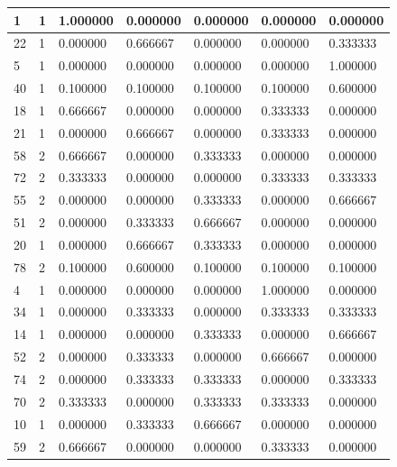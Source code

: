 {\begin{tabular}{|l|l|l|l|l|l|l|}
        1 & 1 & 1.000000 & 0.000000 & 0.000000 & 0.000000 & 0.000000 \\ \hline
        22 & 1 & 0.000000 & 0.666667 & 0.000000 & 0.000000 & 0.333333 \\ \hline
        5 & 1 & 0.000000 & 0.000000 & 0.000000 & 0.000000 & 1.000000 \\ \hline
        40 & 1 & 0.100000 & 0.100000 & 0.100000 & 0.100000 & 0.600000 \\ \hline
        18 & 1 & 0.666667 & 0.000000 & 0.000000 & 0.333333 & 0.000000 \\ \hline
        21 & 1 & 0.000000 & 0.666667 & 0.000000 & 0.333333 & 0.000000 \\ \hline
        58 & 2 & 0.666667 & 0.000000 & 0.333333 & 0.000000 & 0.000000 \\ \hline
        72 & 2 & 0.333333 & 0.000000 & 0.000000 & 0.333333 & 0.333333 \\ \hline
        55 & 2 & 0.000000 & 0.000000 & 0.333333 & 0.000000 & 0.666667 \\ \hline
        51 & 2 & 0.000000 & 0.333333 & 0.666667 & 0.000000 & 0.000000 \\ \hline
        20 & 1 & 0.000000 & 0.666667 & 0.333333 & 0.000000 & 0.000000 \\ \hline
        78 & 2 & 0.100000 & 0.600000 & 0.100000 & 0.100000 & 0.100000 \\ \hline
        4 & 1 & 0.000000 & 0.000000 & 0.000000 & 1.000000 & 0.000000 \\ \hline
        34 & 1 & 0.000000 & 0.333333 & 0.000000 & 0.333333 & 0.333333 \\ \hline
        14 & 1 & 0.000000 & 0.000000 & 0.333333 & 0.000000 & 0.666667 \\ \hline
        52 & 2 & 0.000000 & 0.333333 & 0.000000 & 0.666667 & 0.000000 \\ \hline
        74 & 2 & 0.000000 & 0.333333 & 0.333333 & 0.000000 & 0.333333 \\ \hline
        70 & 2 & 0.333333 & 0.000000 & 0.333333 & 0.333333 & 0.000000 \\ \hline
        10 & 1 & 0.000000 & 0.333333 & 0.666667 & 0.000000 & 0.000000 \\ \hline
        59 & 2 & 0.666667 & 0.000000 & 0.000000 & 0.333333 & 0.000000 \\ \hline
\midrule       
\end{tabular}
}